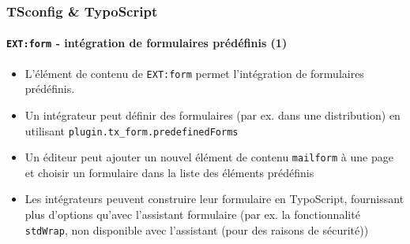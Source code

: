 \begin{frame}[fragile]
	\frametitle{TSconfig \& TypoScript}
	\framesubtitle{\texttt{EXT:form} - intégration de formulaires prédéfinis (1)}

	\lstset{basicstyle=\tiny\ttfamily}

	\begin{itemize}

		\item L'élément de contenu de \texttt{EXT:form} permet l'intégration de
			formulaires prédéfinis.

		\item Un intégrateur peut définir des formulaires (par ex. dans une distribution)
			en utilisant \texttt{plugin.tx\_form.predefinedForms}

		\item Un éditeur peut ajouter un nouvel élément de contenu \texttt{mailform} à une
			page et choisir un formulaire dans la liste des éléments prédéfinis

		\item Les intégrateurs peuvent construire leur formulaire en TypoScript, fournissant
			plus d'options qu'avec l'assistant formulaire (par ex. la fonctionnalité
			\texttt{stdWrap}, non disponible avec l'assistant (pour des raisons de sécurité))

	\end{itemize}

\end{frame}

